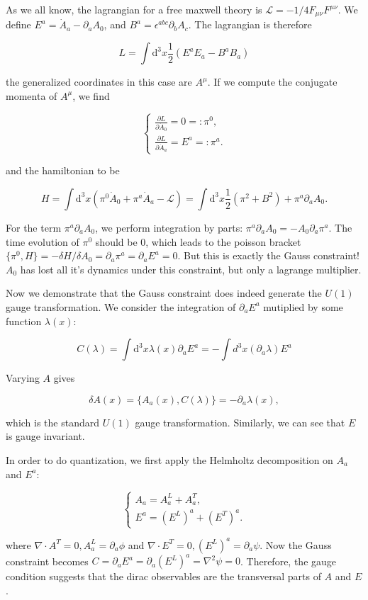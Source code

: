 \documentclass{article}
\begin{document}
As we all know, the lagrangian for a free maxwell theory is $\mathcal{L} = -1/4F_{\mu\nu}F^{\mu\nu}$. We define $E^a = \dot{A}_a - \partial_a A_0$, and $B^a = \epsilon^{abc}\partial_b A_c$. The lagrangian is therefore

$$
L = \int \mathrm{d}^3x\frac{1}{2}\left(E^aE_a - B^aB_a\right)
$$

the generalized coordinates in this case are $A^\mu$. If we compute the conjugate momenta of $A^\mu$, we find

$$
\begin{cases}
    \frac{\partial L}{\partial \dot{A}_0} = 0 =: \pi^0,\\
    \frac{\partial L}{\partial \dot{A}_a} = E^a =: \pi^a.
\end{cases}
$$

and the hamiltonian to be

$$
H = \int\mathrm{d}^3x\left(\pi^0 \dot{A}_0 + \pi^a\dot{A}_a - \mathcal{L}\right) = \int\mathrm{d}^3x\frac{1}{2}(\pi^2 + B^2) + \pi^a\partial_a A_0.
$$

For the term $\pi^a\partial_a A_0$, we perform integration by parts: $\pi^a\partial_a A_0 = -A_0\partial_a\pi^a$. The time evolution of $\pi^0$ should be 0, which leads to the poisson bracket $\{\pi^0, H\} = -\delta H/\delta A_0 = \partial_a\pi^a = \partial_a E^a = 0$. But this is exactly the Gauss constraint! $A_0$ has lost all it's dynamics under this constraint, but only a lagrange multiplier.

Now we demonstrate that the Gauss constraint does indeed generate the $U(1)$ gauge transformation. We consider the integration of $\partial_a E^a$ mutiplied by some function $\lambda(x)$:

$$
C(\lambda) = \int \mathrm{d}^3x \lambda(x) \partial_a E^a = - \int d^3x (\partial_a \lambda) E^a
$$

Varying $A$ gives

$$
\delta A(x) = \{A_a(x), C(\lambda)\} = -\partial_a\lambda(x),
$$

which is the standard $U(1)$ gauge transformation. Similarly, we can see that $E$ is gauge invariant.

In order to do quantization, we first apply the Helmholtz decomposition on $A_a$ and $E^a$:

$$
\begin{cases}
    A_a = A^L_a + A^T_a,\\
    E^a = (E^L)^a + (E^T)^a.
\end{cases}
$$

where $\nabla\cdot A^T = 0, A^L_a = \partial_a\phi$ and $\nabla\cdot E^T = 0, (E^L)^a = \partial_a\psi$. Now the Gauss constraint becomes $C = \partial_a E^a = \partial_a (E^L)^a = \nabla^2\psi = 0$. Therefore, the gauge condition suggests that the dirac observables are the transversal parts of $A$ and $E$.
\end{document}
